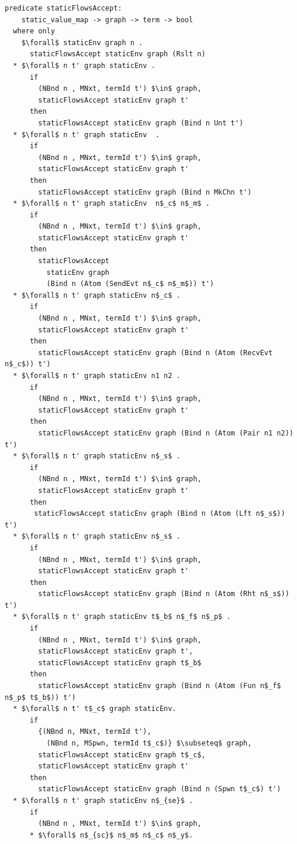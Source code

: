 \documentclass[letterpaper, 11pt]{extarticle}
\begin{document}
\begin{lstlisting}[language=logic, mathescape]
  predicate staticFlowsAccept:
    static_value_map -> graph -> term -> bool
  where only
    $\forall$ staticEnv graph n .
      staticFlowsAccept staticEnv graph (Rslt n)
  * $\forall$ n t' graph staticEnv .
      if
        (NBnd n , MNxt, termId t') $\in$ graph,
        staticFlowsAccept staticEnv graph t'
      then
        staticFlowsAccept staticEnv graph (Bind n Unt t')
  * $\forall$ n t' graph staticEnv  .
      if
        (NBnd n , MNxt, termId t') $\in$ graph,
        staticFlowsAccept staticEnv graph t'
      then
        staticFlowsAccept staticEnv graph (Bind n MkChn t')
  * $\forall$ n t' graph staticEnv  n$_c$ n$_m$ .
      if
        (NBnd n , MNxt, termId t') $\in$ graph,
        staticFlowsAccept staticEnv graph t'
      then
        staticFlowsAccept
          staticEnv graph
          (Bind n (Atom (SendEvt n$_c$ n$_m$)) t')
  * $\forall$ n t' graph staticEnv n$_c$ .
      if
        (NBnd n , MNxt, termId t') $\in$ graph,
        staticFlowsAccept staticEnv graph t'
      then
        staticFlowsAccept staticEnv graph (Bind n (Atom (RecvEvt n$_c$)) t')
  * $\forall$ n t' graph staticEnv n1 n2 .
      if
        (NBnd n , MNxt, termId t') $\in$ graph,
        staticFlowsAccept staticEnv graph t'
      then
        staticFlowsAccept staticEnv graph (Bind n (Atom (Pair n1 n2)) t')
  * $\forall$ n t' graph staticEnv n$_s$ .
      if
        (NBnd n , MNxt, termId t') $\in$ graph,
        staticFlowsAccept staticEnv graph t'
      then
       staticFlowsAccept staticEnv graph (Bind n (Atom (Lft n$_s$)) t')
  * $\forall$ n t' graph staticEnv n$_s$ .
      if
        (NBnd n , MNxt, termId t') $\in$ graph,
        staticFlowsAccept staticEnv graph t'
      then
        staticFlowsAccept staticEnv graph (Bind n (Atom (Rht n$_s$)) t')
  * $\forall$ n t' graph staticEnv t$_b$ n$_f$ n$_p$ .
      if
        (NBnd n , MNxt, termId t') $\in$ graph,
        staticFlowsAccept staticEnv graph t',
        staticFlowsAccept staticEnv graph t$_b$
      then
        staticFlowsAccept staticEnv graph (Bind n (Atom (Fun n$_f$ n$_p$ t$_b$)) t')
  * $\forall$ n t' t$_c$ graph staticEnv.
      if
        {(NBnd n, MNxt, termId t'),
          (NBnd n, MSpwn, termId t$_c$)} $\subseteq$ graph,
        staticFlowsAccept staticEnv graph t$_c$,
        staticFlowsAccept staticEnv graph t'
      then
        staticFlowsAccept staticEnv graph (Bind n (Spwn t$_c$) t')
  * $\forall$ n t' graph staticEnv n$_{se}$ .
      if
        (NBnd n , MNxt, termId t') $\in$ graph,
      * $\forall$ n$_{sc}$ n$_m$ n$_c$ n$_y$.

\end{lstlisting}
\end{document}
